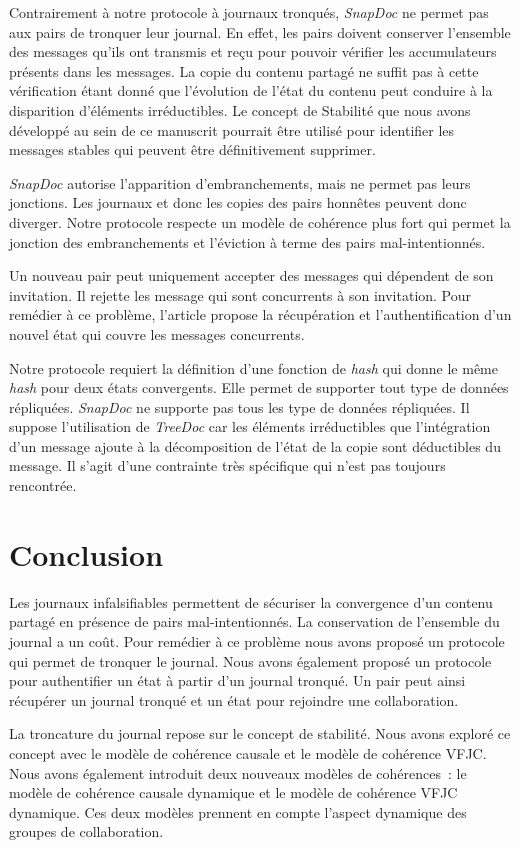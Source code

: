 Contrairement à notre protocole à journaux tronqués, \emph{SnapDoc} ne permet pas aux pairs de tronquer leur journal.
En effet, les pairs doivent conserver l'ensemble des messages qu'ils ont transmis et reçu pour pouvoir vérifier les accumulateurs présents dans les messages.
La copie du contenu partagé ne suffit pas à cette vérification étant donné que l'évolution de l'état du contenu peut conduire à la disparition d'éléments irréductibles.
Le concept de Stabilité que nous avons développé au sein de ce manuscrit pourrait être utilisé pour identifier les messages stables qui peuvent être définitivement supprimer.

\emph{SnapDoc} autorise l'apparition d'embranchements, mais ne permet pas leurs jonctions.
Les journaux et donc les copies des pairs honnêtes peuvent donc diverger.
Notre protocole respecte un modèle de cohérence plus fort qui permet la jonction des embranchements et l'éviction à terme des pairs mal-intentionnés.

Un nouveau pair peut uniquement accepter des messages qui dépendent de son invitation.
Il rejette les message qui sont concurrents à son invitation.
Pour remédier à ce problème, l'article propose la récupération et l'authentification d'un nouvel état qui couvre les messages concurrents.

Notre protocole requiert la définition d'une fonction de \emph{hash} qui donne le même \emph{hash} pour deux états convergents.
Elle permet de supporter tout type de données répliquées.
\emph{SnapDoc} ne supporte pas tous les type de données répliquées.
Il suppose l'utilisation de \emph{TreeDoc} car les éléments irréductibles que l'intégration d'un message ajoute à la décomposition de l'état de la copie sont déductibles du message.
Il s'agit d'une contrainte très spécifique qui n'est pas toujours rencontrée.


\section{Conclusion}

Les journaux infalsifiables permettent de sécuriser la convergence d'un contenu partagé en présence de pairs mal-intentionnés.
La conservation de l'ensemble du journal a un coût.
Pour remédier à ce problème nous avons proposé un protocole qui permet de tronquer le journal.
Nous avons également proposé un protocole pour authentifier un état à partir d'un journal tronqué.
Un pair peut ainsi récupérer un journal tronqué et un état pour rejoindre une collaboration.

La troncature du journal repose sur le concept de stabilité.
Nous avons exploré ce concept avec le modèle de cohérence causale et le modèle de cohérence \ac{VFJC}.
Nous avons également introduit deux nouveaux modèles de cohérences~: le modèle de cohérence causale dynamique et le modèle de cohérence \ac{VFJC} dynamique.
Ces deux modèles prennent en compte l'aspect dynamique des groupes de collaboration.

